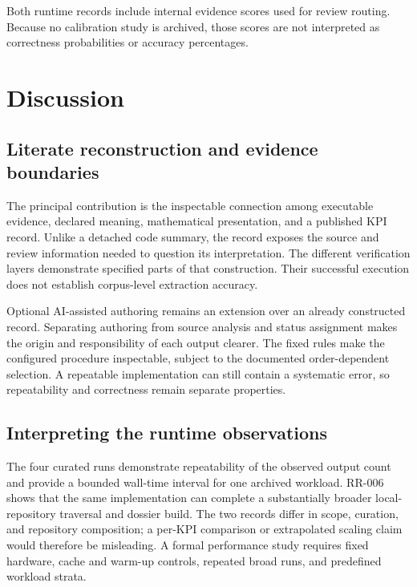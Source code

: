 \documentclass[a4paper,fleqn]{cas-dc}
\begin{document}
Both runtime records include internal evidence scores used for review routing. Because no calibration study is archived, those scores are not interpreted as correctness probabilities or accuracy percentages.

\section{Discussion}

\subsection{Literate reconstruction and evidence boundaries}

The principal contribution is the inspectable connection among executable evidence, declared meaning, mathematical presentation, and a published KPI record. Unlike a detached code summary, the record exposes the source and review information needed to question its interpretation. The different verification layers demonstrate specified parts of that construction. Their successful execution does not establish corpus-level extraction accuracy.

Optional AI-assisted authoring remains an extension over an already constructed record. Separating authoring from source analysis and status assignment makes the origin and responsibility of each output clearer. The fixed rules make the configured procedure inspectable, subject to the documented order-dependent selection. A repeatable implementation can still contain a systematic error, so repeatability and correctness remain separate properties.

\subsection{Interpreting the runtime observations}

The four curated runs demonstrate repeatability of the observed output count and provide a bounded wall-time interval for one archived workload. RR-006 shows that the same implementation can complete a substantially broader local-repository traversal and dossier build. The two records differ in scope, curation, and repository composition; a per-KPI comparison or extrapolated scaling claim would therefore be misleading. A formal performance study requires fixed hardware, cache and warm-up controls, repeated broad runs, and predefined workload strata.
\end{document}
